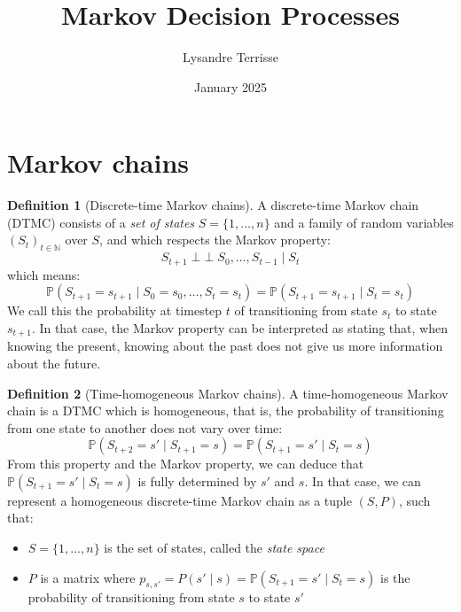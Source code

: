 \documentclass{article}
\title{Markov Decision Processes}
\author{Lysandre Terrisse}
\date{January 2025}
\theoremstyle{definition}
\newtheorem{definition}{Definition}[section]
\theoremstyle{remark}
\theoremstyle{example}
\DeclareMathOperator{\ind}{\perp \!\!\! \perp}
\begin{document}
\maketitle


\section{Markov chains}

\begin{definition}[Discrete-time Markov chains]
		A discrete-time Markov chain (DTMC) consists of a \textit{set of states} $S = \{1, \dots, n\}$ and a family of random variables $(S_t)_{t \in \mathbb{N}}$ over $S$, and which respects the Markov property:
				$$S_{t+1} \ind S_0, \dots, S_{t-1} \mid S_t$$
which means:
				$$\mathbb{P}(S_{t+1} = s_{t+1} \mid S_0 = s_0, \dots, S_t = s_t) = \mathbb{P}(S_{t+1} = s_{t+1} \mid S_t = s_t)$$
		We call this the probability at timestep $t$ of transitioning from state $s_t$ to state $s_{t+1}$. In that case, the Markov property can be interpreted as stating that, when knowing the present, knowing about the past does not give us more information about the future.
\end{definition}

\begin{definition}[Time-homogeneous Markov chains]
		A time-homogeneous Markov chain is a DTMC which is homogeneous, that is, the probability of transitioning from one state to another does not vary over time:
				$$\mathbb{P}(S_{t+2} = s' \mid S_{t+1} = s) = \mathbb{P}(S_{t+1} = s' \mid S_t = s)$$
		From this property and the Markov property, we can deduce that $\mathbb{P}(S_{t+1} = s' \mid S_t = s)$ is fully determined by $s'$ and $s$. In that case, we can represent a homogeneous discrete-time Markov chain as a tuple $(S, P)$, such that:
		\begin{itemize}
				\item $S = \{1, \dots, n\}$ is the set of states, called the \textit{state space}
				\item $P$ is a matrix where $p_{s,s'} = P(s' \mid s) = \mathbb{P}(S_{t+1}= s' \mid S_t = s)$ is the probability of transitioning from state $s$ to state $s'$
		\end{itemize}
\end{definition}
\end{document}
